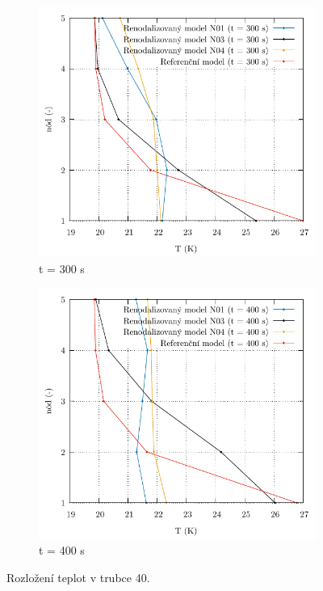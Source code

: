 \begin{figure}
	\centering
	\begin{subfigure}{0.5\textwidth}
		\centering
		\includegraphics[width=\textwidth, trim={0cm 0cm 0cm 0cm}, clip]{./05_TH_model_VR_1/grafy/temp_rozl/t_rozl_300.pdf}
		\caption{t = 300 s}
		\label{fig:temp_dist_srovnani_prilohy_300s}
	\end{subfigure}%
	\hfill
	\begin{subfigure}{0.5\textwidth}
		\centering
		\includegraphics[width=\textwidth, trim={0cm 0cm 0cm 0cm}, clip]{./05_TH_model_VR_1/grafy/temp_rozl/t_rozl_400.pdf}
				\caption{t = 400 s}
		\label{fig:temp_dist_srovnani_prilohy_400s}
	\end{subfigure}
	\caption{Rozložení teplot v trubce 40.}
\end{figure}
